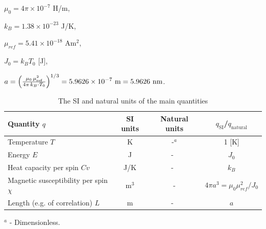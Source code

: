 \documentclass[
    aps,
    prb,
    reprint,           %
    superscriptaddress,%
    amsmath,amssymb,
    floatfix
]{revtex4-2}
\begin{document}
$\mu_0 = 4\pi \times 10^{-7}$ H/m,

$k_B = 1.38 \times 10^{-23}$ J/K,

$\mu_{ref} = 5.41 \times 10^{-18}$ Am$^2$,

$J_{0}=k_{B}T_{0}$ [J], 

$a={\left(\frac{{\mu }_{0}\text{\,}{\mu }_{\text{ref}}^{2}}{4\pi \text{\,}k_{B}\cdot T_{0}}\right)}^{1/3}=5.9626\times {10}^{-7}\text{\ m}=5.9626\text{\ nm}$.

\begin{table}[t]
    \centering
    \caption{The SI and natural units of the main quantities}
    \label{tab:natUnits}
    \begin{ruledtabular}
    \begin{tabular}{lccc}
        Quantity $q$ & SI units & Natural units & $q_{\text{SI}}$/$q_{\text{natural}}$\\
        \hline
        Temperature $T$	& K & -$^a$ & 1 [K] \\
        Energy $E$	& J	& -$\;\;$	& $J_0$ \\
        Heat capacity per spin $Cv$	& J/K & -$\;\;$ & $k_B$ \\
        Magnetic susceptibility per spin $\chi$ & m$^3$ & - & $4\pi a^3= \mu_0 \mu_{ref}^2/J_0$ \\
        Length (e.g. of correlation) $L$ & m & -$\;\;$ & $a$
    \end{tabular}
    \end{ruledtabular}
    \raggedright $^a$ - Dimensionless.
\end{table}

\end{document}
